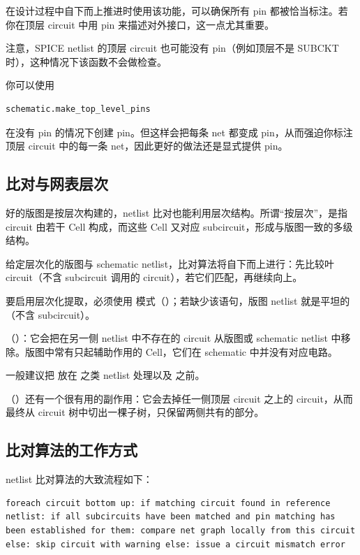 在设计过程中自下而上推进时使用该功能，可以确保所有 pin 都被恰当标注。若你在顶层 circuit 中用 pin 来描述对外接口，这一点尤其重要。

注意，SPICE netlist 的顶层 circuit 也可能没有 pin（例如顶层不是 SUBCKT 时），这种情况下该函数不会做检查。

你可以使用

\begin{lstlisting}
schematic.make_top_level_pins
\end{lstlisting}

在没有 pin 的情况下创建 pin。但这样会把每条 net 都变成 pin，从而强迫你标注顶层 circuit 中的每一条 net，因此更好的做法还是显式提供 pin。

\subsection{比对与网表层次}

好的版图是按层次构建的，netlist 比对也能利用层次结构。所谓“按层次”，是指 circuit 由若干 Cell 构成，而这些 Cell 又对应 subcircuit，形成与版图一致的多级结构。

给定层次化的版图与 schematic netlist，比对算法将自下而上进行：先比较叶 circuit（不含 subcircuit 调用的 circuit），若它们匹配，再继续向上。

要启用层次化提取，必须使用  模式（）；若缺少该语句，版图 netlist 就是平坦的（不含 subcircuit）。

（）：它会把在另一侧 netlist 中不存在的 circuit 从版图或 schematic netlist 中移除。版图中常有只起辅助作用的 Cell，它们在 schematic 中并没有对应电路。

一般建议把  放在  之类 netlist 处理以及  之前。

（）还有一个很有用的副作用：它会去掉任一侧顶层 circuit 之上的 circuit，从而最终从 circuit 树中切出一棵子树，只保留两侧共有的部分。

\subsection{比对算法的工作方式}

netlist 比对算法的大致流程如下：

\begin{lstlisting}
foreach circuit bottom up: if matching circuit found in reference netlist: if all subcircuits have been matched and pin matching has been established for them: compare net graph locally from this circuit else: skip circuit with warning else: issue a circuit mismatch error
\end{lstlisting}

